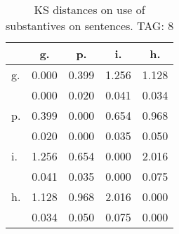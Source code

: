 \begin{table}[h!]
\begin{center}
\begin{tabular}{| l | c | c | c | c |}\hline
 & g. & p. & i. & h. \\\hline
g. & 0.000  & 0.399  & 1.256  & 1.128 \\\hline
 & 0.000  & 0.020  & 0.041  & 0.034 \\\hline
p. & 0.399  & 0.000  & 0.654  & 0.968 \\\hline
 & 0.020  & 0.000  & 0.035  & 0.050 \\\hline
i. & 1.256  & 0.654  & 0.000  & 2.016 \\\hline
 & 0.041  & 0.035  & 0.000  & 0.075 \\\hline
h. & 1.128  & 0.968  & 2.016  & 0.000 \\\hline
 & 0.034  & 0.050  & 0.075  & 0.000 \\\hline
\end{tabular}
\caption{KS distances on use of substantives on sentences. TAG: 8}
\end{center}
\end{table}